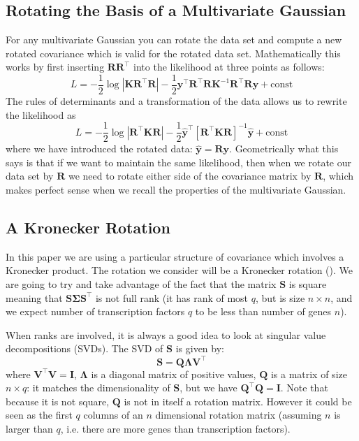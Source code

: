 \subsection{Rotating the Basis of a Multivariate Gaussian}
For any multivariate Gaussian you can rotate the data set and compute a new rotated covariance which is valid for the 
rotated data set. Mathematically this works by first inserting $\mathbf{R}\mathbf{R}^\top$ into the likelihood at 
three points as follows:
\begin{equation} \label{eq:LikelihoodRotation}
  L = -\frac{1}{2} \log |\mathbf{K}\mathbf{R}^\top\mathbf{R}| 
      - \frac{1}{2} \mathbf{y}^\top\mathbf{R}^\top\mathbf{R} \mathbf{K}^{-1}\mathbf{R}^\top\mathbf{R} \mathbf{y} 
      + \text{const}
\end{equation}
The rules of determinants and a transformation of the data allows us to rewrite the likelihood as
\begin{equation} \label{eq:LikelihoodRotationRerite}
  L = -\frac{1}{2} \log |\mathbf{R}^\top\mathbf{K}\mathbf{R}| 
      - \frac{1}{2} \hat{\mathbf{y}}^\top \left[\mathbf{R}^\top\mathbf{K}\mathbf{R}\right]^{-1}\hat{\mathbf{y}} 
      + \text{const}
\end{equation}
where we have introduced the rotated data: $\hat{\mathbf{y}}=\mathbf{R} \mathbf{y}$. 
Geometrically what this says is that if we want to maintain the same likelihood, then when we rotate our data set by 
$\mathbf{R}$ we need to rotate either side of the covariance matrix by $\mathbf{R}$, which makes perfect sense 
when we recall the properties of the multivariate Gaussian. 

\subsection{A Kronecker Rotation}
In this paper we are using a particular structure of covariance which involves a Kronecker product. 
The rotation we consider will be a Kronecker rotation (\cite{Stegle:2011}). 
We are going to try and take advantage of the fact that the matrix $\mathbf{S}$ is square meaning that 
$\mathbf{S}\boldsymbol{\Sigma}\mathbf{S}^\top$ is not full rank (it has rank of most $q$, but is size $n\times n$, and 
we expect number of transcription factors $q$ to be less than number of genes $n$). 

When ranks are involved, it is always a good idea to look at singular value decompositions (SVDs). The SVD of 
$\mathbf{S}$ is given by:
\begin{equation} \label{eq:SVD}
\mathbf{S} = \mathbf{Q} \boldsymbol{\Lambda} \mathbf{V}^\top
\end{equation}
where $\mathbf{V}^\top \mathbf{V} = \mathbf{I}$, $\boldsymbol{\Lambda}$ is a diagonal matrix of positive values, 
$\mathbf{Q}$ is a matrix of size $n\times q$: it matches the dimensionality of $\mathbf{S}$, but we have 
$\mathbf{Q}^\top \mathbf{Q} = \mathbf{I}$. Note that because it is not square, $\mathbf{Q}$ is not in itself a 
rotation matrix. However it could be seen as the first $q$ columns of an $n$ dimensional rotation matrix 
(assuming $n$ is larger than $q$, i.e. there are more genes than transcription factors). 


